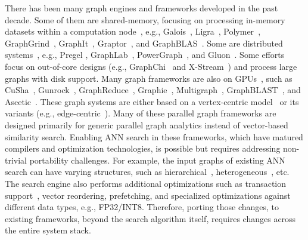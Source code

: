 There has been many graph engines and frameworks developed in the past decade.
Some of them are shared-memory, focusing on processing in-memory datasets within a computation node~\cite{uta2018exploring}, e.g., Galois~\cite{nguyen2013lightweight}, Ligra~\cite{shun2013ligra}, Polymer~\cite{zhang2015numa}, GraphGrind~\cite{sun2017graphgrind}, GraphIt~\cite{zhang2020optimizing}, Graptor~\cite{vandierendonck2020graptor}, and GraphBLAS~\cite{aznaveh2020parallel}.
Some are distributed systems~\cite{rivas2018mpi}, e.g., Pregel \cite{malewicz2010pregel}, GraphLab~\cite{low2014graphlab},  PowerGraph~\cite{joseph2012powergraph}, and Gluon~\cite{dathathri2019gluon}.
Some efforts focus on out-of-core designs (e.g., GraphChi~\cite{aapo2012graphchi} and X-Stream~\cite{roy2013x}) and process large graphs with disk support.
Many graph frameworks are also on GPUs~\cite{DBLP:conf/ppopp/MengLTS19}, such as CuSha~\cite{khorasani2014cusha}, Gunrock~\cite{wang2016gunrock}, GraphReduce~\cite{sengupta2015graphreduce}, Graphie~\cite{han2017graphie}, Multigraph~\cite{hong2017multigraph},  GraphBLAST~\cite{yang2019graphblast}, and Ascetic~\cite{tang2021ascetic}.
These graph systems are either based on a vertex-centric model~\cite{malewicz2010pregel,zhang2018simple} or its variants (e.g., edge-centric~\cite{roy2013x}).
Many of these parallel graph frameworks are designed primarily for generic parallel graph analytics instead of vector-based similarity search. Enabling ANN search in these frameworks, which have matured compilers and optimization technologies, is possible but requires addressing non-trivial portability challenges. For example, the input graphs of existing ANN search can have varying structures, such as hierarchical~\cite{hnsw}, heterogeneous~\cite{diskann,hm-ann}, etc. The search engine also performs additional optimizations such as transaction support~\cite{milvus}, vector reordering, prefetching, and specialized optimizations against different data types, e.g., FP32/INT8. Therefore, porting those changes, to existing frameworks, beyond the search algorithm itself, requires changes across the entire system stack.

